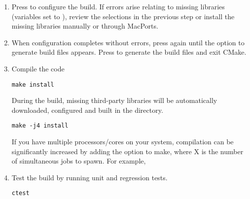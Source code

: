 \begin{enumerate}
    \item Press  to configure the build. If errors arise relating to
        missing libraries (variables set to ), review the 
         selections in the previous
    step or install the missing libraries manually or through MacPorts. 
    
    \item When configuration completes without errors, press  again
    until the option  to generate build files appears. Press 
    to generate the build files and exit CMake.
    
    \item Compile the code
    \begin{lstlisting}[style=BashInputStyle]
        make install
    \end{lstlisting}
    During the build, missing third-party libraries will be automatically
    downloaded, configured and built in the \nekpp {} directory.
    
    \newsavebox\installationMacTip
    \begin{lrbox}{\installationMacTip}\begin{minipage}{0.8\linewidth}
    \begin{lstlisting}[style=BashInputStyle]
    make -j4 install
    \end{lstlisting}
    \end{minipage}
    \end{lrbox}
    
    \begin{tipbox}
    If you have multiple processors/cores on your system, compilation can be
    significantly increased by adding the  option to make, where X is
    the number of simultaneous jobs to spawn. For example,
    \noindent\usebox\installationMacTip
    \end{tipbox}
    
    \item Test the build by running unit and regression tests.
    \begin{lstlisting}[style=BashInputStyle]
    ctest
    \end{lstlisting}
\end{enumerate}



